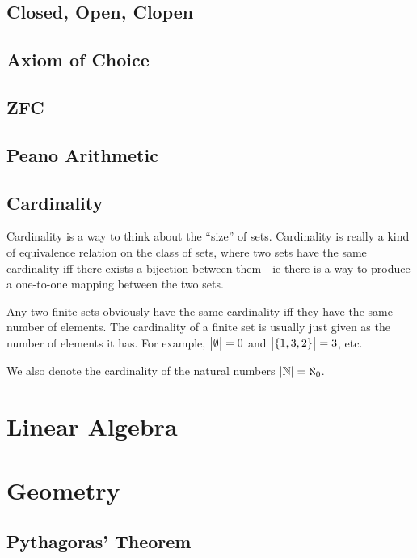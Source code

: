 \documentclass[fleqn,a4paper,11pt]{article}
\newcommand{\setstyle}{\mathbb}
\newcommand{\Naturals}{\setstyle N}
\begin{document}
    \subsection{Closed, Open, Clopen}

    \subsection{Axiom of Choice}

    \subsection{ZFC}

    \subsection{Peano Arithmetic}

    \subsection{Cardinality}


    Cardinality is a way to think about the ``size'' of sets. Cardinality is
    really a kind of equivalence relation on the class of sets, where two sets
    have the same cardinality iff there exists a bijection between them - ie
    there is a way to produce a one-to-one mapping between the two sets.

    Any two finite sets obviously have the same cardinality iff they have the
    same number of elements. The cardinality of a finite set is usually just
    given as the number of elements it has. For example, \(\abs{\emptyset} = 0\)
    and \(\abs{\set{1, 3, 2}} = 3\), etc.

    We also denote the cardinality of the natural numbers
    \(\abs{\Naturals} = \aleph_0\).

    \section{Linear Algebra}

    \section{Geometry}

    \subsection{Pythagoras' Theorem} \label{sec_pythagoras}
\end{document}
